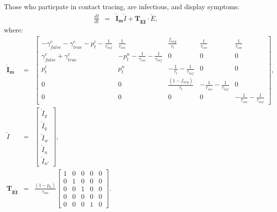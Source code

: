 \documentclass[notitlepage, superscriptaddress]{revtex4-2}
\begin{document}
Those who particpate in contact tracing, are infectious, and display symptoms:
\begin{eqnarray}
\frac{d\check{I}}{dt} &=& \boldsymbol{\check{I}_{m}}  \check{I} + \boldsymbol{T_{\check{E}\check{I}}} \cdot  \check{E}, 
\end{eqnarray}
where:
%
\begin{eqnarray}
\boldsymbol{\check{I}_{m}} &=&
\begin{bmatrix}
 -\gamma^{c}_{false} -\gamma^{c}_{true} - p^{i}_{t} -\frac{1}{\tau_{inf}} & \frac{1}{\tau_{iso}}  & \frac{f_{neg}}{\tau_{t}} & \frac{1}{\tau_{iso}} & \frac{1}{\tau_{iso}} \\
\gamma^{c}_{false} + \gamma^{c}_{true}    &  -p^{n}_{t}  - \frac{1}{\tau_{iso}} - \frac{1}{\tau_{inf}}      &  0    & 0  & 0\\
p^{i}_{t}     &  p^{n}_{t}                  &  -\frac{1}{\tau_{t}}  - \frac{1}{\tau_{inf}}  & 0 & 0\\
0 & 0 & \frac{(1-f_{neg})}{\tau_{t}}  & -\frac{1}{\tau_{iso}}  -  \frac{1}{\tau_{inf}} & 0 \\ 
0 & 0 & 0 & 0 & -\frac{1}{\tau_{iso}}  -  \frac{1}{\tau_{inf}}
\end{bmatrix}, \\ 
%
\check{I} &=& 
\begin{bmatrix}
\check{I}_{g} \\ \check{I}_{q} \\ \check{I}_{w}\\ \check{I}_{n} \\ \check{I}_{n'}
\end{bmatrix}, \\
%
\boldsymbol{T_{\check{E}\check{I}}} &=& \frac{(1-p_{a})}{\tau_{inc}} 
\begin{bmatrix}
1  & 0 & 0 & 0 & 0\\ 
0  & 1 & 0 & 0 & 0 \\ 
0  & 0 & 1 & 0 & 0 \\ 
0  & 0 & 0 & 0 & 0 \\ 
0  & 0 & 0 & 1 & 0 
\end{bmatrix}.
\end{eqnarray}

\end{document}
